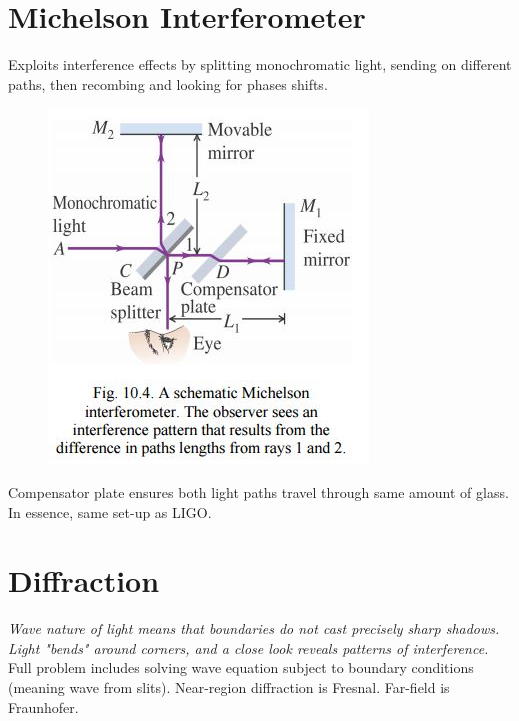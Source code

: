 \documentclass[a4paper, 11pt, normalem]{report}
\begin{document}
\section{Michelson Interferometer}
Exploits interference effects by splitting monochromatic light, sending on different paths, then recombing and looking for phases shifts.
\begin{figure}[H]
    \centering
    \includegraphics[scale=0.8]{Michelson.jpg} 
\end{figure}
Compensator plate ensures both light paths travel through same amount of glass.
In essence, same set-up as LIGO.

\section{Diffraction}
\emph{Wave nature of light means that boundaries do not cast precisely sharp shadows. Light "bends" around corners, and a close look reveals patterns of interference.} \\
Full problem includes solving wave equation subject to boundary conditions (meaning wave from slits).
Near-region diffraction is Fresnal.
Far-field is Fraunhofer.
\end{document}
